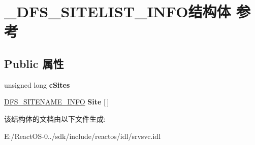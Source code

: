 \hypertarget{struct___d_f_s___s_i_t_e_l_i_s_t___i_n_f_o}{}\section{\+\_\+\+D\+F\+S\+\_\+\+S\+I\+T\+E\+L\+I\+S\+T\+\_\+\+I\+N\+F\+O结构体 参考}
\label{struct___d_f_s___s_i_t_e_l_i_s_t___i_n_f_o}
\subsection*{Public 属性}
\begin{DoxyCompactItemize}
\item 
\mbox{\label{struct___d_f_s___s_i_t_e_l_i_s_t___i_n_f_o_ad86fa9ea317fc6b53e3e199999ee7398}} 
unsigned long {\bfseries c\+Sites}
\item 
\mbox{\label{struct___d_f_s___s_i_t_e_l_i_s_t___i_n_f_o_ad7c6c6038581076c9db50f068b69f07e}} 
\hyperlink{struct___d_f_s___s_i_t_e_n_a_m_e___i_n_f_o}{D\+F\+S\+\_\+\+S\+I\+T\+E\+N\+A\+M\+E\+\_\+\+I\+N\+FO} {\bfseries Site} \mbox{[}$\,$\mbox{]}
\end{DoxyCompactItemize}


该结构体的文档由以下文件生成\+:\begin{DoxyCompactItemize}
\item 
E\+:/\+React\+O\+S-\/0../sdk/include/reactos/idl/srvsvc.\+idl\end{DoxyCompactItemize}
